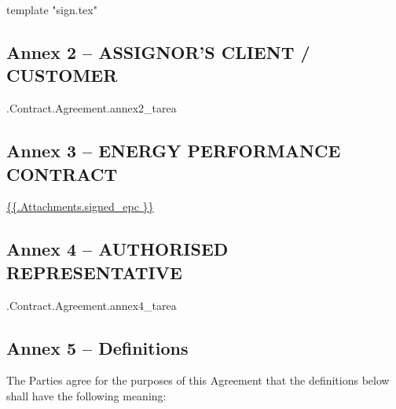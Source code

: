 \documentclass[a4paper]{article}
\begin{document}
{{template "sign.tex"}}

\subsection{Annex 2 – ASSIGNOR'S CLIENT / CUSTOMER}

\iffalse input forfaitingFields.annex2_tarea value="{{.Contract.Agreement.annex2_tarea}}" type="textarea" \fi {{.Contract.Agreement.annex2_tarea}}

\pagebreak

\subsection{Annex 3 – ENERGY PERFORMANCE CONTRACT}

\url{ {{.Attachments.signed_epc }} }

\iffalse attachment value="signed epc" \fi

\pagebreak

\subsection{Annex 4 – AUTHORISED REPRESENTATIVE}

\iffalse input forfaitingFields.annex4_tarea value="{{.Contract.Agreement.annex4_tarea}}" type="textarea" \fi {{.Contract.Agreement.annex4_tarea}}

\pagebreak

\subsection{Annex 5 – Definitions}


\renewcommand*{\theenumi}{\roman{enumi}}

The Parties agree for the purposes of this Agreement that the
definitions below shall have the following meaning: \par
\end{document}
